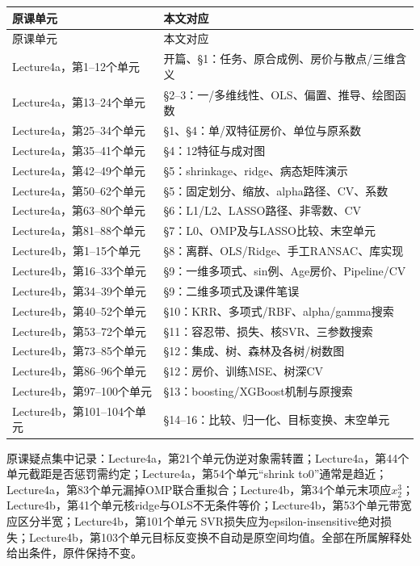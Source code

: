 \begingroup
\small\setlength{\tabcolsep}{3pt}
\renewcommand{\arraystretch}{1.12}
\setlength{\LTpre}{.35\baselineskip}
\setlength{\LTpost}{.35\baselineskip}
\begin{longtable}{@{}>{\raggedright\arraybackslash}p{}>{\raggedright\arraybackslash}p{}@{}}
\toprule
原课单元 & 本文对应 \\
\midrule\endfirsthead
原课单元 & 本文对应 \\
\midrule\endhead
\bottomrule\endfoot
Lecture4a，第1–12个单元 & 开篇、§1：任务、原合成例、房价与散点/三维含义 \\
Lecture4a，第13–24个单元 & §2–3：一/多维线性、OLS、偏置、推导、绘图函数 \\
Lecture4a，第25–34个单元 & §1、§4：单/双特征房价、单位与原系数 \\
Lecture4a，第35–41个单元 & §4：12特征与成对图 \\
Lecture4a，第42–49个单元 & §5：shrinkage、ridge、病态矩阵演示 \\
Lecture4a，第50–62个单元 & §5：固定划分、缩放、alpha路径、CV、系数 \\
Lecture4a，第63–80个单元 & §6：L1/L2、LASSO路径、非零数、CV \\
Lecture4a，第81–88个单元 & §7：L0、OMP及与LASSO比较、末空单元 \\
Lecture4b，第1–15个单元 & §8：离群、OLS/Ridge、手工RANSAC、库实现 \\
Lecture4b，第16–33个单元 & §9：一维多项式、sin例、Age房价、Pipeline/CV \\
Lecture4b，第34–39个单元 & §9：二维多项式及课件笔误 \\
Lecture4b，第40–52个单元 & §10：KRR、多项式/RBF、alpha/gamma搜索 \\
Lecture4b，第53–72个单元 & §11：容忍带、损失、核SVR、三参数搜索 \\
Lecture4b，第73–85个单元 & §12：集成、树、森林及各树/树数图 \\
Lecture4b，第86–96个单元 & §12：房价、训练MSE、树深CV \\
Lecture4b，第97–100个单元 & §13：boosting/XGBoost机制与原搜索 \\
Lecture4b，第101–104个单元 & §14–16：比较、归一化、目标变换、末空单元 \\
\end{longtable}
\endgroup


原课疑点集中记录：Lecture4a，第21个单元伪逆对象需转置；Lecture4a，第44个单元截距是否惩罚需约定；Lecture4a，第54个单元“shrink to0”通常是趋近；Lecture4a，第83个单元漏掉OMP联合重拟合；Lecture4b，第34个单元末项应\(x_2^3\)；Lecture4b，第41个单元核ridge与OLS不无条件等价；Lecture4b，第53个单元带宽应区分半宽；Lecture4b，第101个单元 SVR损失应为epsilon-insensitive绝对损失；Lecture4b，第103个单元目标反变换不自动是原空间均值。全部在所属解释处给出条件，原件保持不变。
